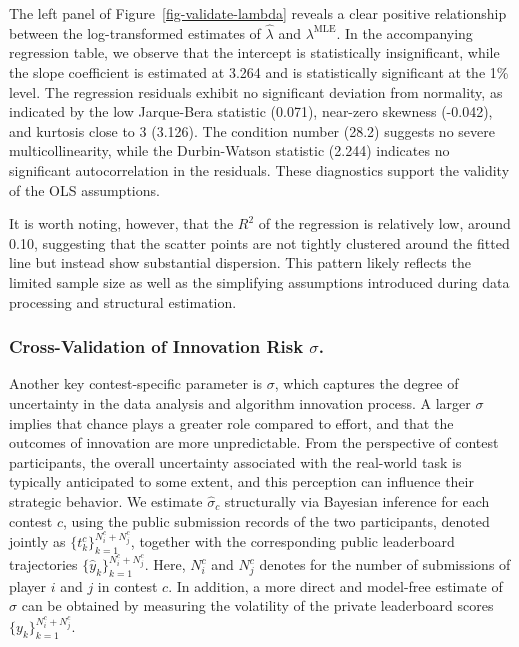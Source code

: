 \documentclass[mnsc]{informs3}
\begin{document}
The left panel of Figure~\ref{fig-validate-lambda} reveals a clear positive relationship between the log-transformed estimates of $\hat\lambda$ and $\lambda^{\text{MLE}}$.
In the accompanying regression table, we observe that the intercept is statistically insignificant, while the slope coefficient is estimated at 3.264 and is statistically significant at the 1\% level.
The regression residuals exhibit no significant deviation from normality, as indicated by the low Jarque-Bera statistic (0.071), near-zero skewness (-0.042), and kurtosis close to 3 (3.126). 
The condition number (28.2) suggests no severe multicollinearity, while the Durbin-Watson statistic (2.244) indicates no significant autocorrelation in the residuals. 
These diagnostics support the validity of the OLS assumptions.

It is worth noting, however, that the $R^2$ of the regression is relatively low, around 0.10, suggesting that the scatter points are not tightly clustered around the fitted line but instead show substantial dispersion.
This pattern likely reflects the limited sample size as well as the simplifying assumptions introduced during data processing and structural estimation.




\subsubsection{Cross-Validation of Innovation Risk $\sigma$.}

Another key contest-specific parameter is $\sigma$, which captures the degree of uncertainty in the data analysis and algorithm innovation process. 
A larger $\sigma$ implies that chance plays a greater role compared to effort, and that the outcomes of innovation are more unpredictable. 
From the perspective of contest participants, the overall uncertainty associated with the real-world task is typically anticipated to some extent, and this perception can influence their strategic behavior.
We estimate $\hat{\sigma}_c$ structurally via Bayesian inference for each contest $c$, using the public submission records of the two participants, denoted jointly as $\{t_k^c\}_{k=1}^{N^c_i + N^c_j}$, together with the corresponding public leaderboard trajectories $\{\hat{y}_{k}\}_{k=1}^{N^c_i + N^c_j}$. 
Here, $N^c_i$ and $N^c_j$ denotes for the number of submissions of player $i$ and $j$ in contest $c$. 
In addition, a more direct and model-free estimate of $\sigma$ can be obtained by measuring the volatility of the private leaderboard scores $\{y_k\}_{k=1}^{N^c_i+N^c_j}$.
\end{document}
